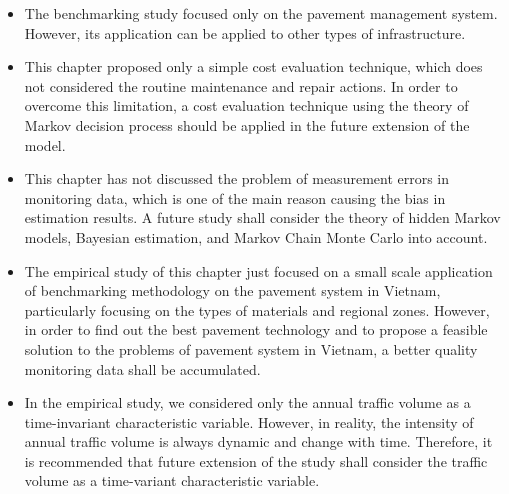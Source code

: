 \begin{itemize}
\item The benchmarking study focused only on the pavement management system. However, its application can be applied to other types of infrastructure.
\item This chapter proposed only a simple cost evaluation technique, which does not considered the routine maintenance and repair actions. In order to overcome this limitation, a cost evaluation technique using the theory of Markov decision process should be applied in the future extension of the model.
\item This chapter has not discussed the problem of measurement errors in monitoring data, which is one of the main reason causing the bias in estimation results. A future study shall consider the theory of hidden Markov models, Bayesian estimation, and Markov Chain Monte Carlo into account.
\item The empirical study of this chapter just focused on a small scale application of benchmarking methodology on the pavement system in Vietnam, particularly focusing on the types of materials and regional zones. However, in order to find out the best pavement technology and to propose a feasible solution to the problems of pavement system in Vietnam, a better quality monitoring data shall be accumulated.
\item In the empirical study, we considered only the annual traffic volume as a time-invariant characteristic variable. However, in reality, the intensity of annual traffic volume is always dynamic and change with time. Therefore, it is recommended that future extension of the study shall consider the traffic volume as a time-variant characteristic variable.
\end{itemize}